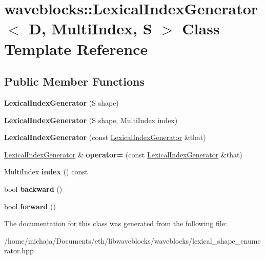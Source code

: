 \hypertarget{classwaveblocks_1_1_lexical_index_generator}{}\section{waveblocks\+:\+:Lexical\+Index\+Generator$<$ D, Multi\+Index, S $>$ Class Template Reference}
\label{classwaveblocks_1_1_lexical_index_generator}
\subsection*{Public Member Functions}
\begin{DoxyCompactItemize}
\item 
\hypertarget{classwaveblocks_1_1_lexical_index_generator_a1a0a38f8706ce6198ea68598fdcd1de3}{}{\bfseries Lexical\+Index\+Generator} (S shape)\label{classwaveblocks_1_1_lexical_index_generator_a1a0a38f8706ce6198ea68598fdcd1de3}

\item 
\hypertarget{classwaveblocks_1_1_lexical_index_generator_a1a48f523968fda75e151898fced283b6}{}{\bfseries Lexical\+Index\+Generator} (S shape, Multi\+Index index)\label{classwaveblocks_1_1_lexical_index_generator_a1a48f523968fda75e151898fced283b6}

\item 
\hypertarget{classwaveblocks_1_1_lexical_index_generator_ac3ba6069521e3ec394c2f4f8025ac6d9}{}{\bfseries Lexical\+Index\+Generator} (const \hyperlink{classwaveblocks_1_1_lexical_index_generator}{Lexical\+Index\+Generator} \&that)\label{classwaveblocks_1_1_lexical_index_generator_ac3ba6069521e3ec394c2f4f8025ac6d9}

\item 
\hypertarget{classwaveblocks_1_1_lexical_index_generator_a25490f7b4ee18d19b681739c29c41c9a}{}\hyperlink{classwaveblocks_1_1_lexical_index_generator}{Lexical\+Index\+Generator} \& {\bfseries operator=} (const \hyperlink{classwaveblocks_1_1_lexical_index_generator}{Lexical\+Index\+Generator} \&that)\label{classwaveblocks_1_1_lexical_index_generator_a25490f7b4ee18d19b681739c29c41c9a}

\item 
\hypertarget{classwaveblocks_1_1_lexical_index_generator_a6ad27c94d3cb50c15ca0bc6bce3a031f}{}Multi\+Index {\bfseries index} () const \label{classwaveblocks_1_1_lexical_index_generator_a6ad27c94d3cb50c15ca0bc6bce3a031f}

\item 
\hypertarget{classwaveblocks_1_1_lexical_index_generator_a0c305c5ce1b0964c1556a9ba1d307cc5}{}bool {\bfseries backward} ()\label{classwaveblocks_1_1_lexical_index_generator_a0c305c5ce1b0964c1556a9ba1d307cc5}

\item 
\hypertarget{classwaveblocks_1_1_lexical_index_generator_adbad07c3469682311430d9824bdd1f3a}{}bool {\bfseries forward} ()\label{classwaveblocks_1_1_lexical_index_generator_adbad07c3469682311430d9824bdd1f3a}

\end{DoxyCompactItemize}


The documentation for this class was generated from the following file\+:\begin{DoxyCompactItemize}
\item 
/home/michaja/\+Documents/eth/libwaveblocks/waveblocks/lexical\+\_\+shape\+\_\+enumerator.\+hpp\end{DoxyCompactItemize}
